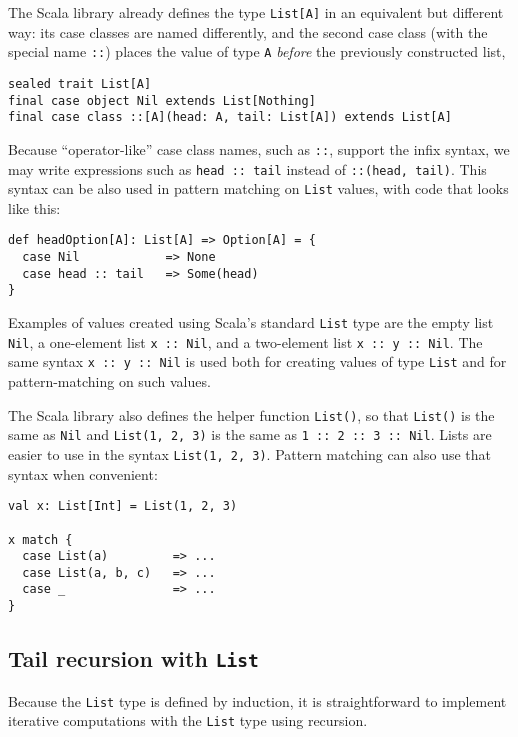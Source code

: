 The Scala library already defines the type \lstinline!List[A]! in
an equivalent but different way: its case classes are named differently,
and the second case class (with the special name \lstinline!::!)
places the value of type \lstinline!A! \emph{before} the previously
constructed list,
\begin{lstlisting}
sealed trait List[A]
final case object Nil extends List[Nothing]
final case class ::[A](head: A, tail: List[A]) extends List[A]
\end{lstlisting}
Because \textsf{``}operator-like\textsf{''} case class names, such as \lstinline!::!,
support the infix syntax, we may write expressions such as \lstinline!head :: tail!
instead of \lstinline!::(head, tail)!. This syntax can be also used
in pattern matching on \lstinline!List! values, with code that looks
like this:
\begin{lstlisting}
def headOption[A]: List[A] => Option[A] = {
  case Nil            => None
  case head :: tail   => Some(head)
}
\end{lstlisting}
Examples of values created using Scala\textsf{'}s standard \lstinline!List!
type are the empty list \lstinline!Nil!, a one-element list \lstinline!x :: Nil!,
and a two-element list \lstinline!x :: y :: Nil!. The same syntax
\lstinline!x :: y :: Nil! is used both for creating values of type
\lstinline!List! and for pattern-matching on such values. 

The Scala library also defines the helper function \lstinline!List()!,
so that \lstinline!List()! is the same as \lstinline!Nil! and \lstinline!List(1, 2, 3)!
is the same as \lstinline!1 :: 2 :: 3 :: Nil!. Lists are easier to
use in the syntax \lstinline!List(1, 2, 3)!. Pattern matching can
also use that syntax when convenient:
\begin{lstlisting}
val x: List[Int] = List(1, 2, 3)

x match {
  case List(a)         => ...
  case List(a, b, c)   => ...
  case _               => ...
}
\end{lstlisting}


\subsection{Tail recursion with \texttt{List}\label{subsec:Tail-recursion-with-list}}

Because the \lstinline!List! type is defined by induction, it is
straightforward to implement iterative computations with the \lstinline!List!
type using recursion.

